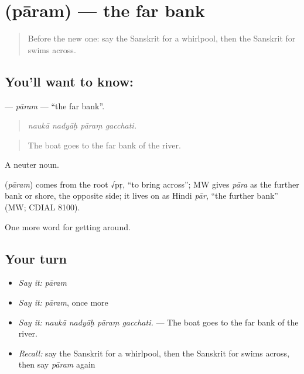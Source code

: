 \section[\texorpdfstring{\sk{पारम्} (pāram)}{पारम् (pāram)}]{ (pāram) — the far bank}

\label{lesson:SA-C415-param}



\begin{quote}
Before the new one: say the Sanskrit for a whirlpool, then the Sanskrit for swims across.
\end{quote}

\subsection*{You'll want to know: }
\textbf{} — \emph{pāram} — \textquotedblleft{}the far bank\textquotedblright{}.

\begin{quote}
   
\end{quote}

\begin{quote}
\emph{naukā nadyāḥ pāraṃ gacchati.}
\end{quote}

\begin{quote}
The boat goes to the far bank of the river.
\end{quote}

A neuter noun.

\begin{cousinweb}
\textbf{} (\emph{pāram}) comes from the root √pṛ, \textquotedblleft{}to bring across\textquotedblright{}; MW gives \emph{pāra} as the further bank or shore, the opposite side; it lives on as Hindi \emph{pār}, \textquotedblleft{}the further bank\textquotedblright{} (MW; CDIAL 8100).
\end{cousinweb}

\begin{grammarlens}[title={What you've built}]
One more word for getting around.
\end{grammarlens}

\subsection*{Your turn}
\begin{itemize}
\raggedright
  \item \emph{Say it:} \emph{pāram}
  \item \emph{Say it:} \emph{pāram}, once more
  \item \emph{Say it:} \emph{naukā nadyāḥ pāraṃ gacchati.} — The boat goes to the far bank of the river.
  \item \emph{Recall:} say the Sanskrit for a whirlpool, then the Sanskrit for swims across, then say \emph{pāram} again
\end{itemize}

